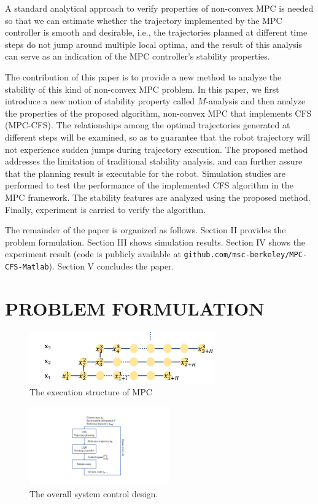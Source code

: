 \documentclass[letterpaper, 10 pt, conference]{ieeeconf}  %
\begin{document}
A standard analytical approach to verify properties of non-convex MPC is needed so that we can estimate whether the trajectory implemented by the MPC controller is smooth and desirable, i.e., the trajectories planned at different time steps do not jump around multiple local optima, and the result of this analysis can serve as an indication of the MPC controller’s stability properties.

The contribution of this paper is to provide a new method to analyze the stability of this kind of non-convex MPC problem. In this paper, we first introduce a new notion of stability property called $M$-analysis and then analyze the properties of the proposed algorithm,  non-convex MPC that implements CFS (MPC-CFS). The relationships among the optimal trajectories generated at different steps will be examined, so as to guarantee that the robot trajectory will not experience sudden jumps during trajectory execution. The proposed method addresses the limitation of traditional stability analysis, and can further assure that the planning result is executable for the robot. Simulation studies are performed to test the performance of the implemented CFS  algorithm in the MPC framework. The stability features are analyzed using the proposed method. Finally, experiment is carried to verify the algorithm.

The remainder of the paper is organized as follows. Section II provides the problem formulation. Section III shows simulation results. Section IV shows the experiment result (code is publicly available at {\tt\small github.com/msc-berkeley/MPC-CFS-Matlab}). Section V concludes the paper.

\section{PROBLEM FORMULATION}

\begin{figure}[t]
\begin{center}
\includegraphics[width=8cm]{src/MPCstruc.png}
\caption{The execution structure of MPC}
\label{fig: mpc}
\end{center}
\end{figure}

\begin{figure}[t]
      \centering
      \includegraphics[width=6cm]{plot/MPCsystem.pdf}
      \caption{The overall system control design. }
      \label{fig:MPCsystem}
\end{figure}
\end{document}
